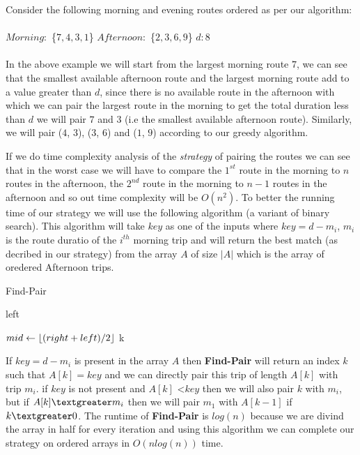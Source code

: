 \documentclass[8pt]{article}
\DeclarePairedDelimiter\floor{\lfloor}{\rfloor}
\begin{document}
Consider the following morning and evening routes ordered as per our algorithm: \\ \\
$Morning:$ \{$7,4,3,1$\} $Afternoon:$ \{$2,3,6,9$\} $d:8$ \\ \\
In the above example we will start from the largest morning route $7$, we can see that the smallest available afternoon route and the largest morning route add to a value greater than $d$, since there is no available route in the afternoon with which we can pair the largest route in the morning to get the total duration less than $d$ we will pair $7$ and $3$ (i.e the smallest available afternoon route). Similarly, we will pair ($4$, $3$), ($3$, $6$) and ($1$, $9$) according to our greedy algorithm.

If we do time complexity analysis of the \textit{strategy} of pairing the routes we can see that in the worst case we will have to compare the $1^{st}$ route in the morning to $n$ routes in the afternoon, the $2^{nd}$ route in the morning to $n - 1$ routes in the afternoon and so out time complexity will be $O(n^2)$. To better the running time of our strategy we will use the following algorithm (a variant of binary search). This algorithm will take $key$ as one of the inputs where $key = d - m_i$, $m_i$ is the route duratio of the $i^{th}$ morning trip and will return the best match (as decribed in our strategy) from the array $A$ of size $\left\vert{A}\right\vert$ which is the array of oredered Afternoon trips.

\begin{algorithm}
\caption{Find-Pair}\label{euclid}
\begin{algorithmic}[1]

    \Return left
\EndIf

\State $mid \leftarrow \floor{(right + left) / 2}$
        \State \Return {}
        \State \Return {}
        \State \Return k
    \EndIf
\EndProcedure
\end{algorithmic}
\end{algorithm}

If $key = d - m_i$ is present in the array $A$ then \textbf{Find-Pair} will return an index $k$ such that $A[k] = key$ and we can directly pair this trip of length $A[k]$ with trip $m_i$. if $key$ is not present and $A[k]$ \textless $key$ then we will also pair $k$ with $m_i$, but if $A[k] \textgreater m_i$ then we will pair $m_1$ with $A[k-1]$ if $k \textgreater 0$. The runtime of \textbf{Find-Pair} is $log(n)$ because we are divind the array in half for every iteration and using this algorithm we can complete our strategy on ordered arrays in $O(nlog(n))$ time.
\end{document}
